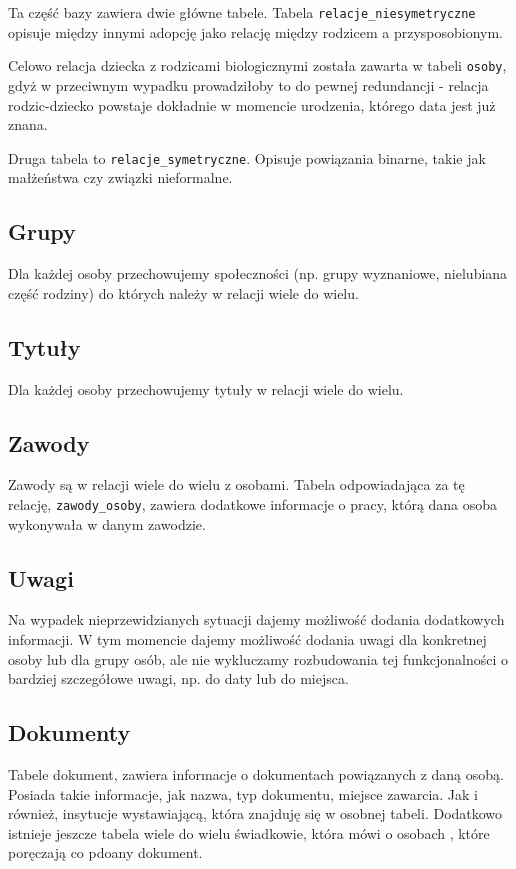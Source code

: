 \documentclass{article}
\begin{document}
Ta część bazy zawiera dwie główne tabele. Tabela \texttt{relacje\_niesymetryczne} opisuje między innymi adopcję jako relację między rodzicem a przysposobionym.

Celowo relacja dziecka z rodzicami biologicznymi została zawarta w tabeli \texttt{osoby}, gdyż w przeciwnym wypadku prowadziłoby to do pewnej redundancji - relacja
rodzic-dziecko powstaje dokładnie w momencie urodzenia, którego data jest już znana.

Druga tabela to \texttt{relacje\_symetryczne}. Opisuje powiązania binarne, takie jak małżeństwa czy związki nieformalne.

\subsection{Grupy}

Dla każdej osoby przechowujemy społeczności (np. grupy wyznaniowe, nielubiana część rodziny) do których należy w relacji wiele do wielu.

\subsection{Tytuły}

Dla każdej osoby przechowujemy tytuły w relacji wiele do wielu.

\subsection{Zawody}

Zawody są w relacji wiele do wielu z osobami. Tabela odpowiadająca za tę relację, \texttt{zawody\_osoby}, zawiera dodatkowe informacje o pracy, którą dana osoba wykonywała w danym zawodzie.

\subsection{Uwagi}

Na wypadek nieprzewidzianych sytuacji dajemy możliwość dodania dodatkowych informacji. W tym momencie dajemy możliwość dodania uwagi dla konkretnej osoby lub dla grupy osób, ale nie wykluczamy rozbudowania tej funkcjonalności o bardziej szczegółowe uwagi, np. do daty lub do miejsca.

\subsection{Dokumenty}

Tabele dokument, zawiera informacje o dokumentach powiązanych z daną osobą. Posiada takie informacje, jak nazwa, typ dokumentu, miejsce zawarcia. Jak i również, insytucje wystawiającą, która znajduję się w osobnej tabeli. Dodatkowo istnieje jeszcze tabela wiele do wielu świadkowie, która mówi o osobach , które poręczają co pdoany dokument.
\end{document}
